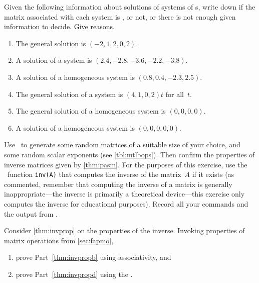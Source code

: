 \begin{exercise} \label{ex:} 
Given the following information about solutions of systems of s, write down if the matrix associated with each system is , or not, or there is not enough given information to decide.  
Give reasons.
\begin{enumerate}
\item The general solution is \((-2,1,2,0,2)\).

\item A solution of a system is \((2.4,-2.8,-3.6,-2.2,-3.8)\).

\item A solution of a homogeneous system is \((0.8,0.4,-2.3,2.5)\).

\item The general solution of a system is \((4,1,0,2)t\) for all~\(t\).

\item The general solution of a homogeneous system is \((0,0,0,0)\).

\item A solution of a homogeneous system is \((0,0,0,0,0)\).

\end{enumerate}
\end{exercise}





\begin{exercise} \label{ex:} 
Use \script\ to generate some random matrices of a suitable size of your choice, and some random scalar exponents (see \autoref{tbl:mtlbops}).
Then confirm the properties of inverse matrices given by \autoref{thm:pasm}.
For the purposes of this exercise, use the \script\ function \verb|inv(A)| that computes the inverse of the matrix~\(A\) if it exists (as commented, remember that computing the inverse of a matrix is generally inappropriate---the inverse is primarily a  theoretical device---this exercise only computes the inverse for educational purposes).
Record all your commands and the output from \script.
\end{exercise}







\begin{exercise} \label{ex:} 
Consider \autoref{thm:invprop} on the properties of the inverse. Invoking properties of matrix operations from \autoref{sec:fapmo},
\begin{enumerate}
\item prove Part~\ref{thm:invpropb} using associativity, and
\item prove Part~\ref{thm:invpropd} using the .
\end{enumerate}
\end{exercise}




